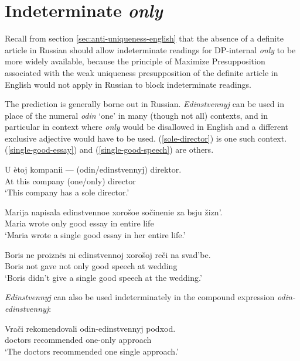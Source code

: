 \section{Indeterminate \textit{only} \label{sec:indeterminate-only}}
Recall from section \ref{sec:anti-uniqueness-english} that the absence of a definite article in Russian should allow indeterminate readings for DP-internal \textit{only} to be more widely available, because the principle of Maximize Presupposition associated with the weak uniqueness presupposition of the definite article in English would not apply in Russian to block indeterminate readings.

The prediction is generally borne out in Russian. \textit{Edinstvennyj} can be used in place of the numeral \textit{odin} `one' in many (though not all) contexts, and in particular in context where \textit{only} would be disallowed in English and a different exclusive adjective would have to be used. (\ref{sole-director}) is one such context. (\ref{single-good-essay}) and (\ref{single-good-speech}) are others.

\begin{exe}
	\ex \label{sole-director} \gll U \`{e}toj kompanii --- (odin/edinstvennyj) direktor.\\
	At this company {} (one/only) director\\
	\glt `This company has a sole director.'

	\ex \label{single-good-essay} \gll Marija napisala edinstvennoe xoro\v{s}oe so\v{c}inenie za bsju \v{z}izn'.\\
	Maria wrote only good essay in entire life\\
	\glt `Maria wrote a single good essay in her entire life.'

	\ex \label{single-good-speech} \gll Boris ne proizn\"{e}s ni edinstvennoj xoro\v{s}oj re\v{c}i na svad'be.\\
	Boris not gave not only good speech at wedding\\
	\glt `Boris didn't give a single good speech at the wedding.'
\end{exe}

\textit{Edinstvennyj} can also be used indeterminately in the compound expression \textit{odin-edinstvennyj}:

\begin{exe}
	\ex \label{odin-edinstvennyj} \gll Vra\v{c}i rekomendovali odin-edinstvennyj podxod.\\
	doctors recommended one-only approach\\
	`The doctors recommended one single approach.'
\end{exe}

